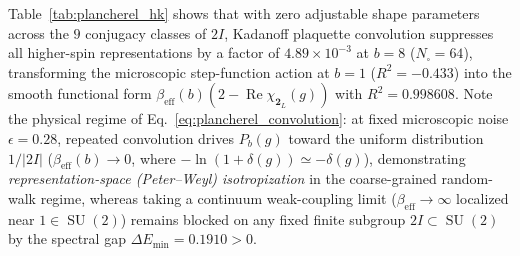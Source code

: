 \documentclass[11pt,a4paper]{article}
\theoremstyle{definition}
\theoremstyle{remark}
\newcommand{\R}{\mathbb{R}}
\newcommand{\SU}{\operatorname{SU}}
\begin{document}
\begin{table}[!htbp]
\centering
\caption{Experiment 6: Convergence of the exact discrete Plancherel block action $S_{\mathrm{eff}}^{(b)}(g) = -\ln(P_b(g)/P_b(1))$ on $\R[2I]$ to the functional form of the $\SU(2)$ Yang--Mills Wilson action $\beta_{\mathrm{eff}}(b)(2 - \operatorname{Re}\chi_{\mathbf{2}_L}(g))$ across Kadanoff scales $b = 1 \dots 8$.}
\label{tab:plancherel_hk}
\end{table}

Table~\ref{tab:plancherel_hk} shows that with zero adjustable shape parameters across the $9$ conjugacy classes of $2I$, Kadanoff plaquette convolution suppresses all higher-spin representations by a factor of $4.89 \times 10^{-3}$ at $b = 8$ ($N_\square = 64$), transforming the microscopic step-function action at $b = 1$ ($R^2 = -0.433$) into the smooth functional form $\beta_{\mathrm{eff}}(b)(2 - \operatorname{Re}\chi_{\mathbf{2}_L}(g))$ with $R^2 = 0.998608$. Note the physical regime of Eq.~\eqref{eq:plancherel_convolution}: at fixed microscopic noise $\epsilon = 0.28$, repeated convolution drives $P_b(g)$ toward the uniform distribution $1/|2I|$ ($\beta_{\mathrm{eff}}(b) \to 0$, where $-\ln(1 + \delta(g)) \simeq -\delta(g)$), demonstrating \emph{representation-space (Peter--Weyl) isotropization} in the coarse-grained random-walk regime, whereas taking a continuum weak-coupling limit ($\beta_{\mathrm{eff}} \to \infty$ localized near $1 \in \SU(2)$) remains blocked on any fixed finite subgroup $2I \subset \SU(2)$ by the spectral gap $\Delta E_{\min} = 0.1910 > 0$.
\end{document}
